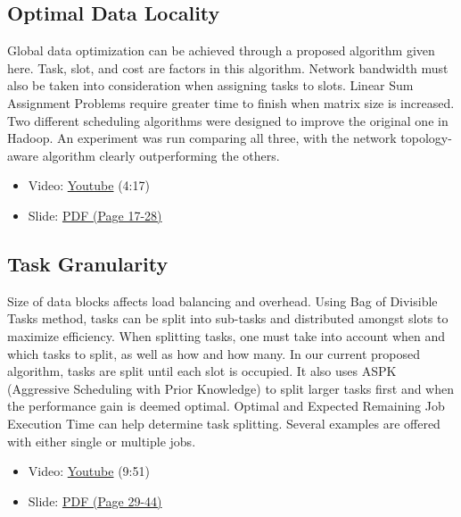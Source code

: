 \subsection{Optimal Data Locality}\label{optimal-data-locality}

Global data optimization can be achieved through a proposed algorithm
given here. Task, slot, and cost are factors in this algorithm. Network
bandwidth must also be taken into consideration when assigning tasks to
slots. Linear Sum Assignment Problems require greater time to finish
when matrix size is increased. Two different scheduling algorithms were
designed to improve the original one in Hadoop. An experiment was run
comparing all three, with the network topology-aware algorithm clearly
outperforming the others.

\begin{itemize}
\tightlist
\item
  Video: \href{https://www.youtube.com/watch?v=Ok8vdrFXo5w}{Youtube}
  (4:17)
\item
  Slide:
  \href{https://drive.google.com/open?id=0B88HKpainTSfT28zLTdKYWhGdGM}{PDF
  (Page 17-28)}
\end{itemize}

\subsection{Task Granularity}\label{task-granularity}

Size of data blocks affects load balancing and overhead. Using Bag of
Divisible Tasks method, tasks can be split into sub-tasks and
distributed amongst slots to maximize efficiency. When splitting tasks,
one must take into account when and which tasks to split, as well as how
and how many. In our current proposed algorithm, tasks are split until
each slot is occupied. It also uses ASPK (Aggressive Scheduling with
Prior Knowledge) to split larger tasks first and when the performance
gain is deemed optimal. Optimal and Expected Remaining Job Execution
Time can help determine task splitting. Several examples are offered
with either single or multiple jobs.

\begin{itemize}
\tightlist
\item
  Video: \href{https://www.youtube.com/watch?v=u9UpgTnOZz4}{Youtube}
  (9:51)
\item
  Slide:
  \href{https://drive.google.com/open?id=0B88HKpainTSfT28zLTdKYWhGdGM}{PDF
  (Page 29-44)}
\end{itemize}

